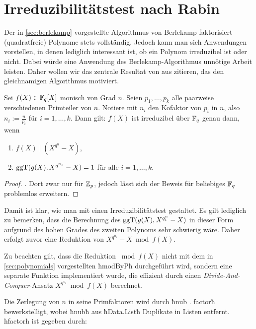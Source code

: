 \section{Irreduzibilitätstest nach Rabin}

Der in \autoref{sec:berlekamp} vorgestellte Algorithmus von Berlekamp
faktorisiert (quadratfreie) Polynome stets vollständig. Jedoch kann man sich
Anwendungen vorstellen, in denen lediglich interessant ist, ob ein Polynom
irreduzibel ist oder nicht. Dabei würde eine Anwendung des
Berlekamp-Algorithmus unnötige Arbeit leisten. 
Daher wollen wir das zentrale Resultat von \citeauthor{rabin} aus 
\autocite{rabin} zitieren, das den gleichnamigen Algorithmus motiviert.

\begin{thm}
  \label{satz:rabin}
  Sei $f(X) \in \mathbb{F}_q[X]$ monisch von Grad $n$. Seien $p_1,\ldots,p_k$ alle
  paarweise verschiedenen Primteiler von $n$. Notiere mit $n_i$ den Kofaktor
  von $p_i$ in $n$, also $n_i := \tfrac{n}{p_i}$ für $i=1,\ldots,k$. Dann gilt:
  $f(X)$ ist irreduzibel über $\mathbb{F}_q$ genau dann, wenn
  \begin{enumerate}
    \item $f(X) \mid (X^{q^n}-X)$,
    \item $\operatorname{ggT}(g(X), X^{q^{n_i}}-X) = 1$ für alle $i=1,\ldots,k$.
  \end{enumerate}
\end{thm}
\begin{proof}
  \autocite[Lemma 1]{rabin}. Dort zwar nur für $\mathbb{Z}_p$, jedoch lässt sich der
  Beweis für beliebiges $\mathbb{F}_q$ problemlos erweitern.
\end{proof}

Damit ist klar, wie man mit  einen Irreduzibilitätstest
gestaltet. Es gilt lediglich zu bemerken, dass die Berechnung des 
$\operatorname{ggT}(g(X),X^{q^n_i}-X)$ in dieser Form aufgrund des hohen Grades des zweiten
Polynoms sehr schwierig wäre. Daher erfolgt zuvor eine Reduktion von
$X^{q^{n_i}}-X \bmod f(X)$.


Zu beachten gilt, dass die Reduktion $\bmod f(X)$ nicht mit dem in
\autoref{sec:polynomials} vorgestellten ħmodByPħ durchgeführt wird, sondern
eine separate Funktion implementiert wurde, die effizient durch einen
\emph{Divide-And-Conquer}-Ansatz $X^{q^{n_i}} \bmod f(X)$ berechnet.


Die Zerlegung von $n$ in seine Primfaktoren wird durch ħnub . factorħ
bewerkstelligt, wobei ħnubħ aus ħData.Listħ Duplikate in Listen entfernt.
ħfactorħ ist gegeben durch:


